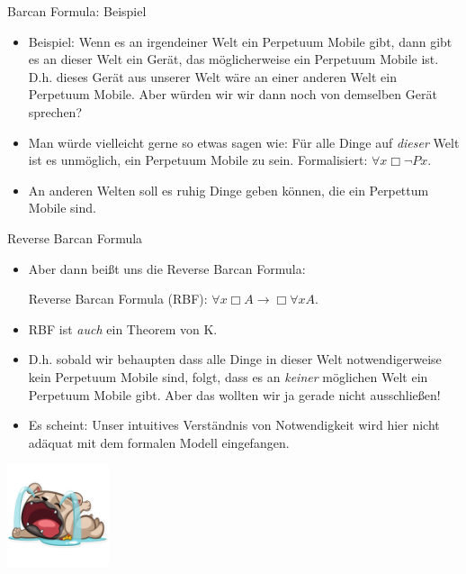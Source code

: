\documentclass[12pt]{beamer}
\begin{document}
\begin{frame}{Barcan Formula: Beispiel}
  \begin{itemize}[<+->]
  \item Beispiel: Wenn es an irgendeiner Welt ein Perpetuum Mobile
    gibt, dann gibt es an dieser Welt ein Gerät, das möglicherweise
    ein Perpetuum Mobile ist. D.h. dieses Gerät aus unserer Welt wäre
    an einer anderen Welt ein Perpetuum Mobile. Aber würden wir wir
    dann noch von demselben Gerät sprechen?
  \item Man würde vielleicht gerne so etwas sagen wie: Für alle Dinge
    auf \emph{dieser} Welt ist es unmöglich, ein Perpetuum Mobile zu
    sein. Formalisiert: $\forall x \Box \neg Px$.
  \item An anderen Welten soll es ruhig Dinge geben können, die ein
    Perpettum Mobile sind.
  \end{itemize}
\end{frame}

\begin{frame}{Reverse Barcan Formula}
  \begin{itemize}[<+->]
  \item Aber dann beißt uns die Reverse Barcan Formula:
    \begin{center}
      Reverse Barcan Formula (RBF):
      $\forall x \Box A \to \Box \forall x A$.
    \end{center}
  \item RBF ist \emph{auch} ein Theorem von K.
  \item D.h. sobald wir behaupten dass alle Dinge in dieser Welt
    notwendigerweise kein Perpetuum Mobile sind, folgt, dass es an
    \emph{keiner} möglichen Welt ein Perpetuum Mobile gibt. Aber das
    wollten wir ja gerade nicht ausschließen!
  \item Es scheint: Unser intuitives Verständnis von Notwendigkeit
    wird hier nicht adäquat mit dem formalen Modell eingefangen.
   
  \end{itemize}
  \pause
  \begin{center}
    \includegraphics[height=3cm]{cryingdog.png}
  \end{center}
\end{frame}
\end{document}

